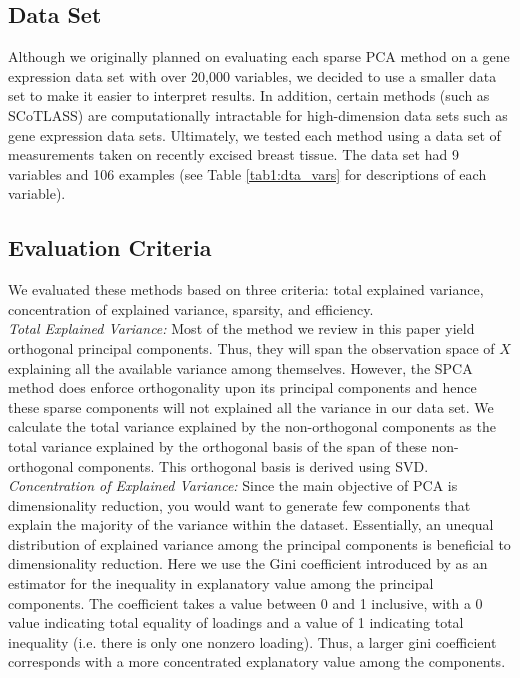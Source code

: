\documentclass[11pt,letterpaper]{report}
\begin{document}
\subsection*{Data Set}

Although we originally planned on evaluating each sparse PCA method on a gene expression data set with over 20,000 variables, we decided to use a smaller data set to make it easier to interpret results. In addition, certain methods (such as SCoTLASS) are computationally intractable for high-dimension data sets such as gene expression data sets. Ultimately, we tested each method using a data set of measurements taken on recently excised breast tissue. The data set had 9 variables and 106 examples (see Table \ref{tab1:dta_vars} for descriptions of each variable). \\

\subsection*{Evaluation Criteria}

We evaluated these methods based on three criteria: total explained variance, concentration of explained variance, sparsity, and efficiency.\\

\textit{Total Explained Variance:} Most of the method we review in this paper yield orthogonal principal components. Thus, they will span the observation space of $X$ explaining all the available variance among themselves. However, the SPCA method does enforce orthogonality upon its principal components and hence these sparse components will not explained all the variance in our data set. We calculate the total variance explained by the non-orthogonal components as the total variance explained by the orthogonal basis of the span of these non-orthogonal components. This orthogonal basis is derived using SVD.\\

\textit{Concentration of Explained Variance:} Since the main objective of PCA is dimensionality reduction, you would want to generate few components that explain the majority of the variance within the dataset. Essentially, an unequal distribution of explained variance among the principal components is beneficial to dimensionality reduction. Here we use the Gini coefficient introduced by  as an estimator for the inequality in explanatory value among the principal components. The coefficient takes a value between 0 and 1 inclusive, with a 0 value indicating total equality of loadings and a value of 1 indicating total inequality (i.e. there is only one nonzero loading). Thus, a larger gini coefficient corresponds with a more concentrated explanatory value among the components.\\ 
\end{document}
